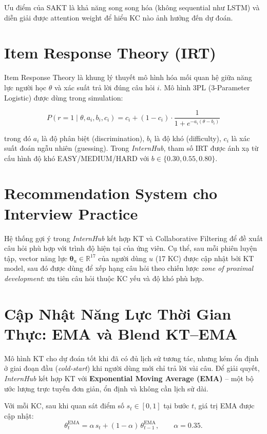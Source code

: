 \documentclass[12pt, a4paper]{report}
\newcommand{\system}{\textit{InternHub}}
\begin{document}
Ưu điểm của SAKT là khả năng song song hóa (không sequential như LSTM) và diễn giải được attention weight để hiểu KC nào ảnh hưởng đến dự đoán.

\section{Item Response Theory (IRT)}
\label{sec:irt}

Item Response Theory \cite{embretson2000item} là khung lý thuyết mô hình hóa mối quan hệ giữa năng lực người học $\theta$ và xác suất trả lời đúng câu hỏi $i$. Mô hình 3PL (3-Parameter Logistic) được dùng trong simulation:

\begin{equation}
  P(r = 1 \mid \theta, a_i, b_i, c_i) = c_i + (1 - c_i) \cdot \frac{1}{1 + e^{-a_i(\theta - b_i)}}
\end{equation}

trong đó $a_i$ là độ phân biệt (discrimination), $b_i$ là độ khó (difficulty), $c_i$ là xác suất đoán ngẫu nhiên (guessing). Trong \system{}, tham số IRT được ánh xạ từ cấu hình độ khó EASY/MEDIUM/HARD với $b \in \{0.30, 0.55, 0.80\}$.

\section{Recommendation System cho Interview Practice}
\label{sec:recsys}

Hệ thống gợi ý trong \system{} kết hợp KT và Collaborative Filtering để đề xuất câu hỏi phù hợp với trình độ hiện tại của ứng viên. Cụ thể, sau mỗi phiên luyện tập, vector năng lực $\bm{\theta}_u \in \mathbb{R}^{17}$ của người dùng $u$ (17 KC) được cập nhật bởi KT model, sau đó được dùng để xếp hạng câu hỏi theo chiến lược \textit{zone of proximal development}: ưu tiên câu hỏi thuộc KC yếu và độ khó phù hợp.

\section{Cập Nhật Năng Lực Thời Gian Thực: EMA và Blend KT--EMA}
\label{sec:ema}

Mô hình KT cho dự đoán tốt khi đã có đủ lịch sử tương tác, nhưng kém ổn định ở giai đoạn đầu (\textit{cold-start}) khi người dùng mới chỉ trả lời vài câu. Để giải quyết, \system{} kết hợp KT với \textbf{Exponential Moving Average (EMA)} -- một bộ ước lượng trực tuyến đơn giản, ổn định và không cần lịch sử dài.

Với mỗi KC, sau khi quan sát điểm số $s_t \in [0,1]$ tại bước $t$, giá trị EMA được cập nhật:
\begin{equation}
  \theta^{\text{EMA}}_t = \alpha \, s_t + (1 - \alpha)\,\theta^{\text{EMA}}_{t-1},
  \qquad \alpha = 0.35 .
\end{equation}
\end{document}

